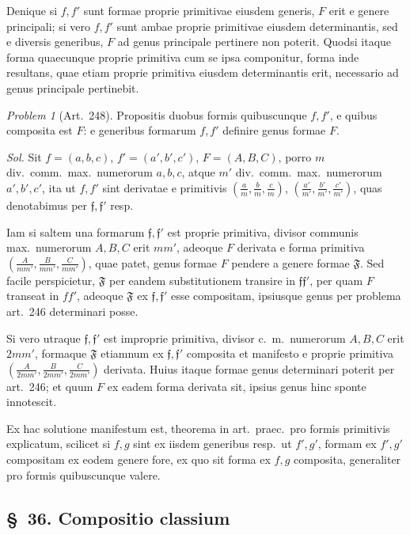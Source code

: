 \documentclass[12pt,a4paper]{article}
\theoremstyle{plain}
\theoremstyle{definition}
\theoremstyle{remark}
\theoremstyle{problemstyle}
\newtheorem{problem}{Problem}[section]
\begin{document}
Denique si $f, f'$ sunt formae proprie primitivae eiusdem generis, $F$ erit e genere principali; si vero $f, f'$ sunt ambae proprie primitivae eiusdem determinantis, sed e diversis generibus, $F$ ad genus principale pertinere non poterit. Quodsi itaque forma quaecunque proprie primitiva cum se ipsa componitur, forma inde resultans, quae etiam proprie primitiva eiusdem determinantis erit, necessario ad genus principale pertinebit.


\begin{problem}[Art.\ 248]
Propositis duobus formis quibuscunque $f, f'$, e quibus composita est $F$: e generibus formarum $f, f'$ definire genus formae $F$.
\end{problem}

\emph{Sol.} Sit $f = (a, b, c)$, $f' = (a', b', c')$, $F = (A, B, C)$, porro $m$ div.\ comm.\ max.\ numerorum $a, b, c$, atque $m'$ div.\ comm.\ max.\ numerorum $a', b', c'$, ita ut $f, f'$ sint derivatae e primitivis $(\frac{a}{m}, \frac{b}{m}, \frac{c}{m})$, $(\frac{a'}{m'}, \frac{b'}{m'}, \frac{c'}{m'})$, quas denotabimus per $\mathfrak{f}, \mathfrak{f}'$ resp.

Iam si saltem una formarum $\mathfrak{f}, \mathfrak{f}'$ est proprie primitiva, divisor communis max.\ numerorum $A, B, C$ erit $mm'$, adeoque $F$ derivata e forma primitiva $(\frac{A}{mm'}, \frac{B}{mm'}, \frac{C}{mm'})$, quae patet, genus formae $F$ pendere a genere formae $\mathfrak{F}$. Sed facile perspicietur, $\mathfrak{F}$ per eandem substitutionem transire in $\mathfrak{ff}'$, per quam $F$ transeat in $ff'$, adeoque $\mathfrak{F}$ ex $\mathfrak{f}, \mathfrak{f}'$ esse compositam, ipsiusque genus per problema art.\ 246 determinari posse.

Si vero utraque $\mathfrak{f}, \mathfrak{f}'$ est improprie primitiva, divisor c.\ m.\ numerorum $A, B, C$ erit $2mm'$, formaque $\mathfrak{F}$ etiamnum ex $\mathfrak{f}, \mathfrak{f}'$ composita et manifesto e proprie primitiva $(\frac{A}{2mm'}, \frac{B}{2mm'}, \frac{C}{2mm'})$ derivata. Huius itaque formae genus determinari poterit per art.\ 246; et quum $F$ ex eadem forma derivata sit, ipsius genus hinc sponte innotescit.

Ex hac solutione manifestum est, theorema in art.\ praec.\ pro formis primitivis explicatum, scilicet si $f, g$ sint ex iisdem generibus resp.\ ut $f', g'$, formam ex $f', g'$ compositam ex eodem genere fore, ex quo sit forma ex $f, g$ composita, generaliter pro formis quibuscunque valere.


\subsection*{\S\ 36. Compositio classium}
\end{document}
